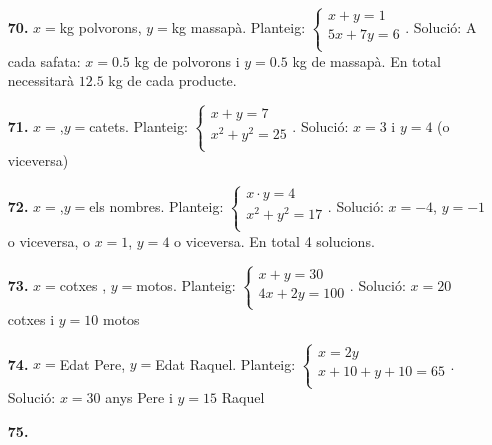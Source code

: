 \documentclass[a4paper, pdf, twoside]{book}
\begin{document}
\begin{multicols}{2}
\begin{enumerate}
\vspace{0.25cm}
\item[\fontfamily{phv}\selectfont\color{blue}\textbf{70. }] 
$x=$kg polvorons, $y=$kg massapà. Planteig: $\left \{\begin {array}{l} x+y=1\\ 5x+7y=6\\ \end {array} \right .$. Solució: A cada safata: $x=0.5$ kg de polvorons i $y=0.5$ kg de massapà. En total necessitarà $12.5$ kg de cada producte.
\vspace{0.25cm}
\item[\fontfamily{phv}\selectfont\color{blue}\textbf{71. }] 
$x=$,$y=$catets. Planteig: $\left \{\begin {array}{l} x+y=7\\ x^2+y^2=25\\ \end {array} \right .$. Solució: $x=3$ i $y=4$ (o viceversa) 
\vspace{0.25cm}
\item[\fontfamily{phv}\selectfont\color{blue}\textbf{72. }] 
$x=$,$y=$els nombres. Planteig: $\left \{\begin {array}{l} x\cdot y = 4\\ x^2+y^2=17\\ \end {array} \right .$. Solució: $x=-4$, $y=-1$ o viceversa, o $x=1$, $y=4$ o viceversa. En total 4 solucions. 
\vspace{0.25cm}
\item[\fontfamily{phv}\selectfont\color{blue}\textbf{73. }] 
$x=$cotxes , $y=$motos. Planteig: $\left \{\begin {array}{l} x+y=30\\ 4x+2y=100\\ \end {array} \right .$. Solució: $x=20$ cotxes i $y=10$ motos
\vspace{0.25cm}
\item[\fontfamily{phv}\selectfont\color{blue}\textbf{74. }] 
$x=$Edat Pere, $y=$Edat Raquel. Planteig: $\left \{\begin {array}{l} x=2y\\ x+10+y+10=65\\ \end {array} \right .$. Solució: $x=30$ anys Pere i $y=15$ Raquel 
\vspace{0.25cm}
\item[\fontfamily{phv}\selectfont\color{blue}\textbf{75. }] 

\end{enumerate}
\end{multicols}
\end{document}
